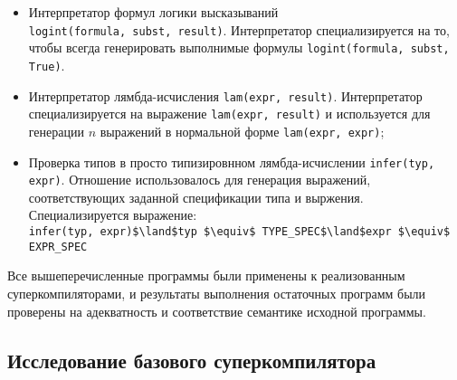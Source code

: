 \begin{itemize}
 \item Интерпретатор формул логики высказываний \\ \lstinline{logint(formula, subst, result)}.
       Интерпретатор специализируется на то, чтобы всегда генерировать выполнимые формулы
       \lstinline{logint(formula, subst, True)}.
 \item Интерпретатор лямбда-исчисления \lstinline{lam(expr, result)}.
       Интерпретатор специализируется на выражение \lstinline{lam(expr, result)}
       и используется для генерации $n$ выражений в нормальной форме \lstinline{lam(expr, expr)};
 \item Проверка типов в просто типизировнном лямбда-исчислении \lstinline{infer(typ, expr)}.
     Отношение использовалось для генерация выражений, соответствующих заданной спецификации типа и выржения.
     Специализируется выражение:\\
 	 \lstinline{infer(typ, expr)$\land$typ $\equiv$ TYPE_SPEC$\land$expr $\equiv$ EXPR_SPEC}
\end{itemize}

Все вышеперечисленные программы были применены к реализованным суперкомпиляторами, и результаты
выполнения остаточных программ были проверены на адекватность и соответствие семантике исходной программы.

\subsection{Исследование базового суперкомпилятора \ukanren}


